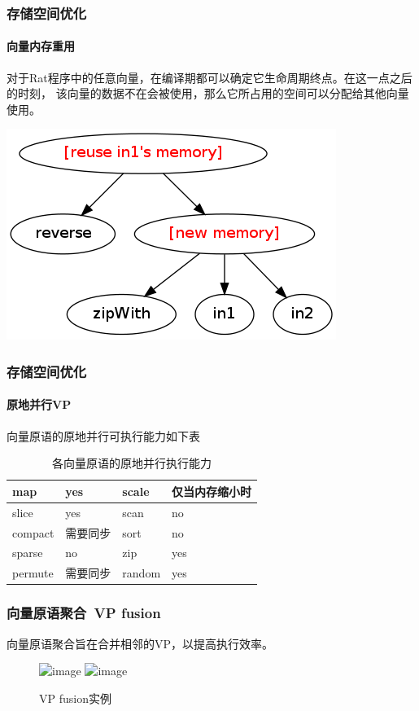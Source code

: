 \documentclass{beamer}
\begin{document}
\begin{frame}
  \frametitle{存储空间优化}
  \framesubtitle{向量内存重用}
  对于Rat程序中的任意向量，在编译期都可以确定它生命周期终点。在这一点之后的时刻，
  该向量的数据不在会被使用，那么它所占用的空间可以分配给其他向量使用。
  \pause
  
  \includegraphics[scale=0.3]{images/reversezip.png}
\end{frame}

\begin{frame}
  \frametitle{存储空间优化}
  \framesubtitle{原地并行VP}
  向量原语的原地并行可执行能力如下表
  \begin{table}
    \caption{各向量原语的原地并行执行能力}
    \begin{tabular}{|l|l||l|l|}
      \hline
      map & yes & scale & 仅当内存缩小时\\
      \hline
      slice & yes & scan & no\\
      \hline
      compact & 需要同步 & sort & no\\
      \hline
      sparse & no & zip & yes\\
      \hline
      permute & 需要同步 & random & yes\\
      \hline
    \end{tabular}
  \end{table}
\end{frame}


\begin{frame}[t]
  \frametitle{向量原语聚合~VP fusion}
  向量原语聚合旨在合并相邻的VP，以提高执行效率。
  
  \begin{figure}
    \caption{VP fusion实例}
    \includegraphics<1>[scale=0.4]{images/vp-fusion-1.png}
    \includegraphics<2>[scale=0.4]{images/vp-fusion-2.png}
  \end{figure}
\end{frame}
\end{document}
